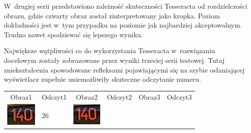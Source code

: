 W~drugiej serii przedstawiono zależność skuteczności Tesseracta od 
rozdzielczości obrazu, gdzie czwarty obraz został zinterpretowany
jako kropka. Poziom dokładności jest w~tym przypadku na poziomie
jak najbardziej akceptowalnym. Trudno nawet spodziewać się lepszego
wyniku.

Największe wątpliwości
co do wykorzystania Tesseracta w~rozwiązaniu docelowym zostały zobrazowane
przez wyniki trzeciej serii testowej. Tutaj zniekształcenia spowodowane
refleksami pojawiającymi się na szybie osłaniającej wyświetlacz
zupełnie uniemożliwiły skuteczne odczytanie numeru.

\begin{table}[h!]
  \centering
  \begin{tabular}{c l c l c l}
    Obraz1 & Odczyt1 & Obraz2 & Odczyt2 & Obraz3 & Odczyt3  \\ 
    \begin{minipage}{.2\textwidth}
      \includegraphics[width=\textwidth]{img/exp_number_f01}
    \end{minipage}
    &
     26
    &
    \begin{minipage}{.2\textwidth}
      \includegraphics[width=\textwidth]{img/exp_number_f02}

\end{minipage}
\end{tabular}
\end{table}
